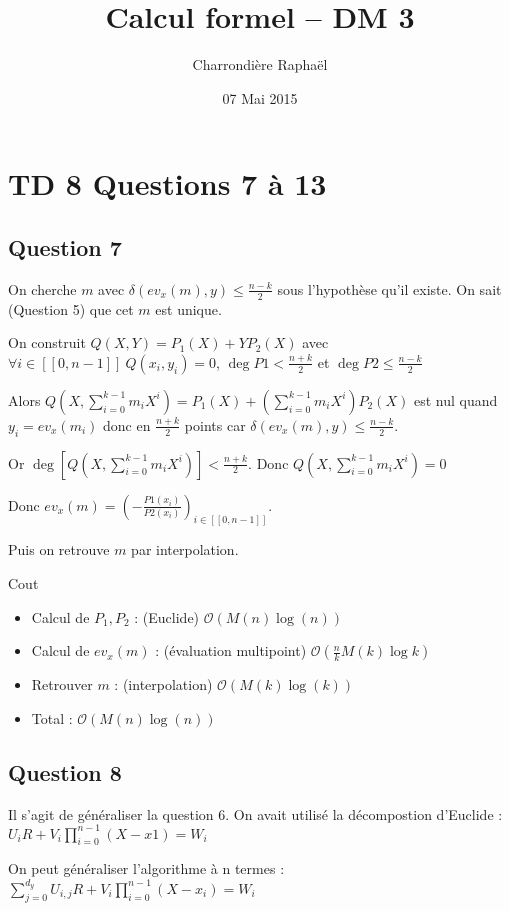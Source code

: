 \documentclass{article}
\title{Calcul formel -- DM 3}
\author{Charrondière Raphaël}
\date{07 Mai 2015}
\newcommand{\Ens}[2]{[\![#1,#2 ]\!]}
\newcommand{\OO}[1]{\mathcal{O}\left( #1 \right )}
\begin{document}
\maketitle
\section*{TD 8 Questions 7 à 13}

\subsection*{Question 7}

On cherche $m$ avec $\delta(ev_x(m),y)\leq\frac{n-k}{2}$ sous l'hypothèse qu'il existe. On sait (Question 5) que cet $m$ est unique.

On construit $Q(X,Y)=P_1(X)+YP_2(X)$ avec $\forall i \in \Ens{0}{n-1} \ Q(x_i,y_i)=0$, $\deg P1<\frac{n+k}{2}$ et $\deg P2\leq \frac{n-k}{2}$

Alors $Q(X,\sum_{i=0}^{k-1}m_iX^i)=P_1(X)+\left(\sum_{i=0}^{k-1}m_iX^i\right)P_2(X)$ est nul quand  $y_i=ev_x(m_i)$ donc en  $\frac{n+k}{2}$ points car $\delta(ev_x(m),y)\leq\frac{n-k}{2}$. 

Or $\deg \left[ Q(X,\sum_{i=0}^{k-1}m_iX^i) \right]<\frac{n+k}{2}$. Donc $Q(X,\sum_{i=0}^{k-1}m_iX^i)=0$

Donc $ev_x(m)=\left(-\frac{P1(x_i)}{P2(x_i)}\right)_{i\in \Ens{0}{n-1}}$.

Puis on retrouve $m$ par interpolation.

Cout 
\begin{itemize}
\item Calcul de $P_1,P_2$ : (Euclide) $\OO{M(n)\log(n)}$
\item Calcul de $ev_x(m)$ : (évaluation multipoint) $\OO{\frac{n}{k}M(k)\log{k}}$  
\item Retrouver $m$ : (interpolation) $\OO{M(k)\log(k)}$
\item Total : $\OO{M(n)\log(n)}$
\end{itemize}

\subsection*{Question 8}

Il s'agit de généraliser la question 6. On avait utilisé la décompostion d'Euclide : $U_iR+V_i\prod_{i=0}^{n-1}(X-x1)=W_i$ 

On peut généraliser l'algorithme à n termes : $\sum_{j=0}^{d_y}U_{i,j}R+V_i\prod_{i=0}^{n-1}(X-x_i)=W_i$ 
\end{document}
